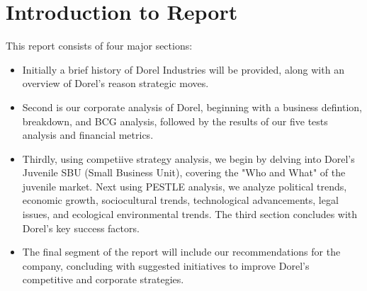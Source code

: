 
\begingroup


\chapter*{Introduction to Report}


This report consists of four major sections:  

\begin{itemize}
\item Initially a brief history of Dorel Industries will be provided, along with an overview of Dorel's reason strategic moves.  

\item Second is our corporate analysis of Dorel, beginning with a business defintion, breakdown, and BCG analysis, followed by the results of our five tests analysis and financial metrics.

\item Thirdly, using competiive strategy analysis, we begin by delving into Dorel's Juvenile SBU (Small Business Unit), covering the "Who and What" of the juvenile market.  Next using PESTLE analysis, we analyze political trends, economic growth, sociocultural trends, technological advancements, legal issues, and ecological environmental trends.  The third section concludes with Dorel's key success factors.

\item The final segment of the report will include our recommendations for the company, concluding with suggested initiatives to improve Dorel’s competitive and corporate strategies.
\end{itemize}

\endgroup



